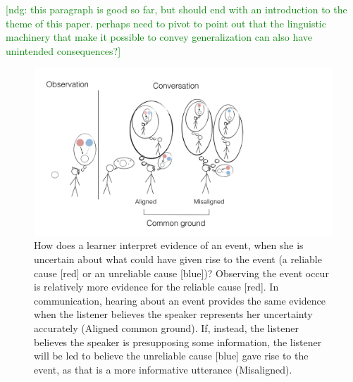 \documentclass[10pt,letterpaper]{article}
\newcommand{\red}[1]{\textcolor{Red}{#1}}
\newcommand{\ndg}[1]{\textcolor{Green}{[ndg: #1]}}
\begin{document}
\ndg{this paragraph is good so far, but should end with an introduction to the theme of this paper. perhaps need to pivot to point out that the linguistic machinery that make it possible to convey generalization can also have unintended consequences?}
\begin{figure}
\centering
    \includegraphics[width=\columnwidth]{cartoon-2}
    \caption{
        \small
How does a learner interpret evidence of an event, when she is uncertain about what could have given rise to the event (a reliable cause [red] or an unreliable cause [blue])? 
   Observing the event occur is relatively more evidence for the reliable cause [red]. 
    In communication, hearing about an event provides the same evidence when the listener believes the speaker represents her uncertainty accurately (Aligned common ground).
   If, instead, the listener believes the speaker is presupposing some information, the listener will be led to believe the unreliable cause [blue] gave rise to the event, as that is a more informative utterance (Misaligned).
    }
  \label{fig:cartoon}
\end{figure}
\end{document}
